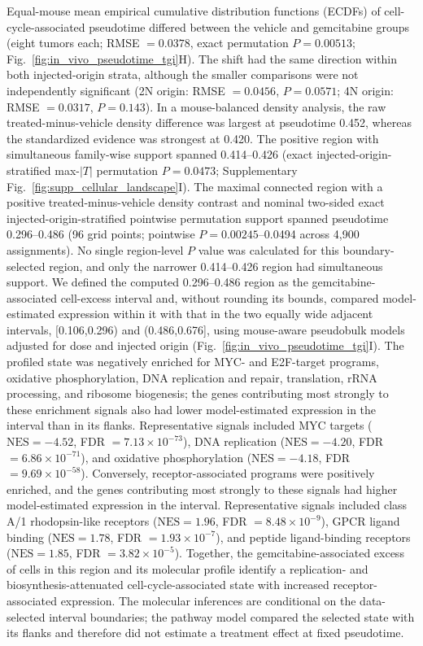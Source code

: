 \documentclass[11pt,notitlepage]{article}
\begin{document}
Equal-mouse mean empirical cumulative distribution functions (ECDFs) of cell-cycle-associated pseudotime differed between the vehicle and gemcitabine groups (eight tumors each; RMSE \(=0.0378\), exact permutation \(P=0.00513\); Fig.~\ref{fig:in_vivo_pseudotime_tgi}H). The shift had the same direction within both injected-origin strata, although the smaller comparisons were not independently significant (2N origin: RMSE \(=0.0456\), \(P=0.0571\); 4N origin: RMSE \(=0.0317\), \(P=0.143\)). In a mouse-balanced density analysis, the raw treated-minus-vehicle density difference was largest at pseudotime 0.452, whereas the standardized evidence was strongest at 0.420. The positive region with simultaneous family-wise support spanned 0.414--0.426 (exact injected-origin-stratified max-\(|T|\) permutation \(P=0.0473\); Supplementary Fig.~\ref{fig:supp_cellular_landscape}I). The maximal connected region with a positive treated-minus-vehicle density contrast and nominal two-sided exact injected-origin-stratified pointwise permutation support spanned pseudotime 0.296--0.486 (96 grid points; pointwise \(P=0.00245\)--0.0494 across 4,900 assignments). No single region-level \(P\) value was calculated for this boundary-selected region, and only the narrower 0.414--0.426 region had simultaneous support. We defined the computed 0.296--0.486 region as the gemcitabine-associated cell-excess interval and, without rounding its bounds, compared model-estimated expression within it with that in the two equally wide adjacent intervals, [0.106,0.296) and (0.486,0.676], using mouse-aware pseudobulk models adjusted for dose and injected origin (Fig.~\ref{fig:in_vivo_pseudotime_tgi}I). The profiled state was negatively enriched for MYC- and E2F-target programs, oxidative phosphorylation, DNA replication and repair, translation, rRNA processing, and ribosome biogenesis; the genes contributing most strongly to these enrichment signals also had lower model-estimated expression in the interval than in its flanks. Representative signals included MYC targets (\(\mathrm{NES}=-4.52\), FDR \(=7.13\times10^{-73}\)), DNA replication (\(\mathrm{NES}=-4.20\), FDR \(=6.86\times10^{-71}\)), and oxidative phosphorylation (\(\mathrm{NES}=-4.18\), FDR \(=9.69\times10^{-58}\)). Conversely, receptor-associated programs were positively enriched, and the genes contributing most strongly to these signals had higher model-estimated expression in the interval. Representative signals included class A/1 rhodopsin-like receptors (\(\mathrm{NES}=1.96\), FDR \(=8.48\times10^{-9}\)), GPCR ligand binding (\(\mathrm{NES}=1.78\), FDR \(=1.93\times10^{-7}\)), and peptide ligand-binding receptors (\(\mathrm{NES}=1.85\), FDR \(=3.82\times10^{-5}\)). Together, the gemcitabine-associated excess of cells in this region and its molecular profile identify a replication- and biosynthesis-attenuated cell-cycle-associated state with increased receptor-associated expression. The molecular inferences are conditional on the data-selected interval boundaries; the pathway model compared the selected state with its flanks and therefore did not estimate a treatment effect at fixed pseudotime.
\end{document}
